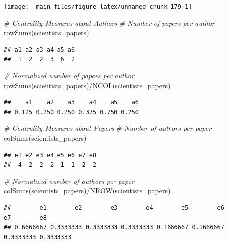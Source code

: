 \documentclass[
  notitlepage,
  onecolumn,
  openany]{book}
\newenvironment{Shaded}{\begin{snugshade}}{\end{snugshade}}
\newcommand{\CommentTok}[1]{\textcolor[rgb]{0.56,0.35,0.01}{\textit{#1}}}
\newcommand{\FunctionTok}[1]{\textcolor[rgb]{0.00,0.00,0.00}{#1}}
\newcommand{\NormalTok}[1]{#1}
\newcommand{\SpecialCharTok}[1]{\textcolor[rgb]{0.00,0.00,0.00}{#1}}
\begin{document}
\texttt{[image: \_main\_files/figure-latex/unnamed-chunk-179-1]}

\begin{Shaded}
\begin{Highlighting}[]
\CommentTok{\# Centrality Measures about Authors}
\CommentTok{\# Number of papers per author}
\FunctionTok{rowSums}\NormalTok{(scientists\_papers)}
\end{Highlighting}
\end{Shaded}

\begin{verbatim}
## a1 a2 a3 a4 a5 a6 
##  1  2  2  3  6  2
\end{verbatim}

\begin{Shaded}
\begin{Highlighting}[]
\CommentTok{\# Normalized number of papers per author}
\FunctionTok{rowSums}\NormalTok{(scientists\_papers)}\SpecialCharTok{/}\FunctionTok{NCOL}\NormalTok{(scientists\_papers)}
\end{Highlighting}
\end{Shaded}

\begin{verbatim}
##    a1    a2    a3    a4    a5    a6 
## 0.125 0.250 0.250 0.375 0.750 0.250
\end{verbatim}

\begin{Shaded}
\begin{Highlighting}[]
\CommentTok{\# Centrality Measures about Papers}
\CommentTok{\# Number of authors per paper}
\FunctionTok{colSums}\NormalTok{(scientists\_papers)}
\end{Highlighting}
\end{Shaded}

\begin{verbatim}
## e1 e2 e3 e4 e5 e6 e7 e8 
##  4  2  2  2  1  1  2  2
\end{verbatim}

\begin{Shaded}
\begin{Highlighting}[]
\CommentTok{\# Normalized number of authors per paper}
\FunctionTok{colSums}\NormalTok{(scientists\_papers)}\SpecialCharTok{/}\FunctionTok{NROW}\NormalTok{(scientists\_papers)}
\end{Highlighting}
\end{Shaded}

\begin{verbatim}
##        e1        e2        e3        e4        e5        e6        e7        e8 
## 0.6666667 0.3333333 0.3333333 0.3333333 0.1666667 0.1666667 0.3333333 0.3333333
\end{verbatim}
\end{document}
